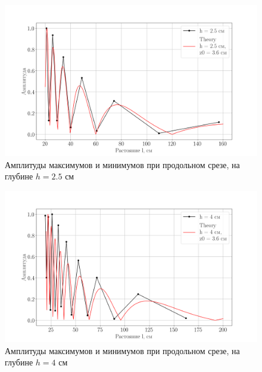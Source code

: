\begin{figure}[h!]
	\centering
	\includegraphics[width =0.75\linewidth]{fig/task22}
	\caption{Амплитуды максимумов и минимумов при продольном срезе, на глубине $h=2.5$ см}
	\label{fig:task22}
\end{figure}

\begin{figure}[h!]
	\centering
	\includegraphics[width =0.75\linewidth]{fig/task23}
	\caption{Амплитуды максимумов и минимумов при продольном срезе, на глубине $h=4$ см}
	\label{fig:task23}
\end{figure}


